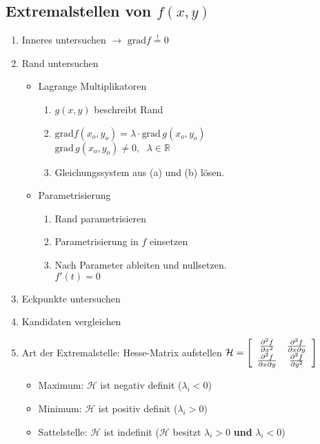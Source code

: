 \subsection{Extremalstellen von $f(x,y)$}
    \vspace{0.25em}
    \begin{enumerate}
        \item Inneres untersuchen $\to$ $\textrm{grad}f \overset{!}{=} 0$
        \item Rand untersuchen
        \begin{itemize}
            \item Lagrange Multiplikatoren
            \begin{enumerate}
                \item $g(x,y)$ beschreibt Rand
                \item $\textrm{grad}f(x_o,y_o) = \lambda \cdot \textrm{grad}\, g(x_o,y_o)$\\[0.25em]
                      \phantom{llll}$\textrm{grad}\, g(x_o,y_o) \neq 0,\phantom{ll} \lambda \in \mathbb{R}$
                \item Gleichungssystem aus (a) und (b) lösen.
            \end{enumerate}
            \item Parametrisierung
            \begin{enumerate}
                \item Rand parametrisieren
                \item Parametrisierung in $f$ einsetzen
                \item Nach Parameter ableiten und nullsetzen.\\[0.25em] \phantom{llll}$f'(t) = 0$
            \end{enumerate}
        \end{itemize}
        \item Eckpunkte untersuchen
        \item Kandidaten vergleichen
        \item Art der Extremalstelle: Hesse-Matrix aufstellen $\mathcal{H} = 
        \left[
            \begin{array}{c c} 
                \frac{\partial^2 f}{\partial x^2}       & \frac{\partial^2 f}{\partial x \partial y}\\
                \frac{\partial^2 f}{\partial x \partial y}  & \frac{\partial^2 f}{\partial y^2}
            \end{array}
        \right]$
            \begin{itemize}
                \item Maximum: $\mathcal{H}$ ist negativ definit ($\lambda_i < 0$)
                \item Minimum: $\mathcal{H}$ ist positiv definit ($\lambda_i > 0$)
                \item Sattelstelle: $\mathcal{H}$ ist indefinit ($\mathcal{H}$ besitzt $\lambda_i > 0$ \textbf{und} $\lambda_i < 0$)
            \end{itemize}
    \end{enumerate}